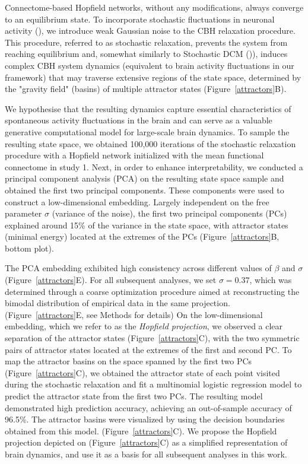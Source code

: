 \documentclass{article}
\begin{document}
Connectome-based Hopfield networks, without any modifications, always converge to an equilibrium state.
To incorporate stochastic fluctuations in neuronal activity (\cite{Robinson_2005}), we introduce weak Gaussian noise to the CBH relaxation procedure. This procedure, referred to as stochastic relaxation, prevents the system from reaching equilibrium and, somewhat similarly to Stochastic DCM (\href{https://doi.org/10.1016/j.neuroimage.2012.04.061}{})), induces complex CBH system dynamics  (equivalent to brain activity fluctuations in our framework) that may traverse extensive regions of the state space, determined by the "gravity field" (basins) of multiple attractor states (Figure~\ref{attractors}B).

We hypothesise that the resulting dynamics capture essential characteristics of spontaneous activity fluctuations in the brain and can serve as a valuable generative computational model for large-scale brain dynamics.
To sample the resulting state space, we obtained 100,000 iterations of the stochastic relaxation procedure with a Hopfield network initialized with the mean functional connectome in study 1.
Next, in order to enhance interpretability, we conducted a principal component analysis (PCA) on the resulting state space sample and obtained the first two principal components. These components were used to construct a low-dimensional embedding.
Largely independent on the free parameter $\sigma$ (variance of the noise), the first two principal components (PCs) explained around 15\% of the variance in the state space, with attractor states (minimal energy) located at the extremes of the PCs (Figure~\ref{attractors}B, bottom plot).

The PCA embedding exhibited high consistency across different values of $\beta$ and $\sigma$ (Figure~\ref{attractors}E).
For all subsequent analyses, we set $\sigma=0.37$, which was determined through a coarse optimization procedure aimed at reconstructing the bimodal distribution of empirical data in the same projection. (Figure~\ref{attractors}E, see Methods for details)
On the low-dimensional embedding, which we refer to as the \textit{Hopfield projection}, we observed a clear separation of the attractor states (Figure~\ref{attractors}C), with the two symmetric pairs of attractor states located at the extremes of the first and second PC.
To map the attractor basins on the space spanned by the first two PCs (Figure~\ref{attractors}C), we obtained the attractor state of each point visited during the stochastic relaxation and fit a multinomial logistic regression model to predict the attractor state from the first two PCs.
The resulting model demonstrated high prediction accuracy, achieving an out-of-sample accuracy of 96.5\%.
The attractor basins were visualized by using the decision boundaries obtained from this model. (Figure~\ref{attractors}C).
We propose the Hopfield projection depicted on (Figure~\ref{attractors}C) as a simplified representation of brain dynamics, and use it as a basis for all subsequent analyses in this work.
\end{document}

